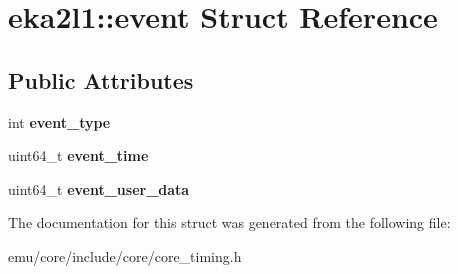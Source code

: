 \hypertarget{structeka2l1_1_1event}{}\section{eka2l1\+:\+:event Struct Reference}
\label{structeka2l1_1_1event}
\subsection*{Public Attributes}
\begin{DoxyCompactItemize}
\item 
\mbox{\label{structeka2l1_1_1event_a0d5242d40b434ca986bb8c7895343403}} 
int {\bfseries event\+\_\+type}
\item 
\mbox{\label{structeka2l1_1_1event_a588d0cfcea6ade3977d1f0506347ef08}} 
uint64\+\_\+t {\bfseries event\+\_\+time}
\item 
\mbox{\label{structeka2l1_1_1event_ae05dabbcd5e98b42605204bfec3dad0c}} 
uint64\+\_\+t {\bfseries event\+\_\+user\+\_\+data}
\end{DoxyCompactItemize}


The documentation for this struct was generated from the following file\+:\begin{DoxyCompactItemize}
\item 
emu/core/include/core/core\+\_\+timing.\+h\end{DoxyCompactItemize}
